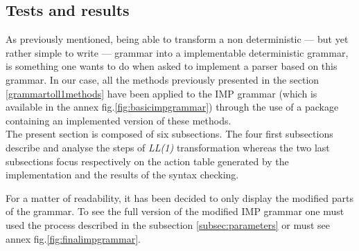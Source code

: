 \documentclass[a4paper,11pt]{article}
\begin{document}
  \subsection{Tests and results}
    \label{sec:results}
    As previously mentioned, being able to transform a non deterministic --- but yet rather simple to write --- grammar into a implementable deterministic grammar, is something one wants to do when asked to implement a parser based on this grammar. In our case, all the methods previously presented in the section \ref{grammartoll1methods} have been applied to the IMP grammar (which is available in the annex fig.\ref{fig:basicimpgrammar}) through the use of a package containing an implemented version of these methods.\\
    The present section is composed of six subsections. The four first subsections describe and analyse the steps of \textit{LL(1)} transformation whereas the two last subsections focus respectively on the action table generated by the implementation and the results of the syntax checking.\\
    \begin{tcolorbox}
      For a matter of readability, it has been decided to only display the modified parts of the grammar. To see the full version of the modified IMP grammar one must used the process described in the subsection \ref{subsec:parameters} or must see annex fig.\ref{fig:finalimpgrammar}.
    \end{tcolorbox}
    
\end{document}
